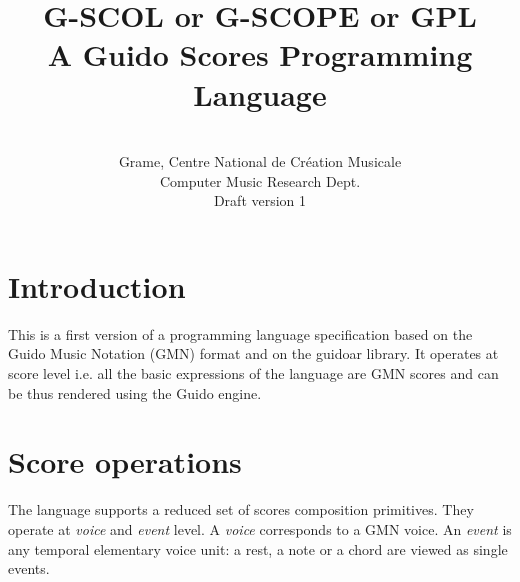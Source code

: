 \documentclass[10pt,a4paper,frenchb]{article}
\begin{document}
\title{\textbf{\textsc{G-SCOL}} or \textbf{\textsc{G-SCOPE}} or \textbf{\textsc{GPL}} \\
A Guido Scores Programming Language}


\author{
\\
Grame, Centre National de Création Musicale \\
Computer Music Research Dept.\\
Draft version 1 
}

\maketitle

\section{Introduction}

This is a first version of a programming language specification based on the Guido Music Notation (GMN) format and on the guidoar library. It operates at score level i.e. all the basic expressions of the language are GMN scores and can be thus rendered using the Guido engine. 


\section{Score operations}

The language supports a reduced set of scores composition primitives.
They operate at \emph{voice} and \emph{event} level. 
A \emph{voice} corresponds to a GMN voice.
An \emph{event} is any temporal elementary voice unit: a rest, a note or a chord are viewed as single events.
\end{document}
